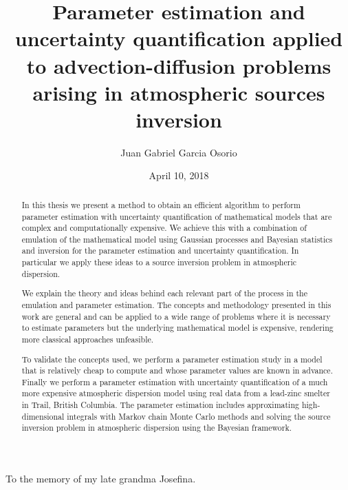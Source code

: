 \documentclass{sfuthesis}
\title{Parameter estimation and uncertainty quantification applied to
advection-diffusion problems arising in atmospheric sources inversion}
\author{Juan Gabriel Garcia Osorio}
\date{April 10, 2018}
\begin{document}
\frontmatter
\maketitle{}
\makecommittee{}


\begin{abstract}
In this thesis we present a method to obtain an efficient algorithm
to perform parameter estimation with uncertainty quantification 
of mathematical models that are complex and computationally
expensive. We achieve this with a combination of emulation of the mathematical
model using Gaussian processes  and Bayesian statistics and inversion for the parameter estimation
and uncertainty quantification.
In particular we apply these ideas to a source inversion problem in atmospheric dispersion.

We  explain the theory and ideas behind each relevant part 
of the process in the emulation and parameter estimation. The concepts and methodology presented 
in this work are general and can be applied
to a wide range of problems where it is necessary to estimate parameters  but the underlying
mathematical model is expensive, rendering  more classical approaches unfeasible.

To validate the concepts used, we perform a parameter estimation study
in a model that is relatively cheap to compute and whose parameter values are known in 
advance. Finally we perform a parameter estimation with
uncertainty quantification of a much more expensive atmospheric dispersion model
using real data from a lead-zinc smelter  in Trail, British Columbia. 
The parameter estimation includes  approximating high-dimensional integrals
with Markov chain Monte Carlo methods and solving the source inversion problem
in atmospheric dispersion using the Bayesian framework.




\end{abstract}


\begin{dedication}
	To the memory of my late grandma Josefina.
\end{dedication}
\end{document}
